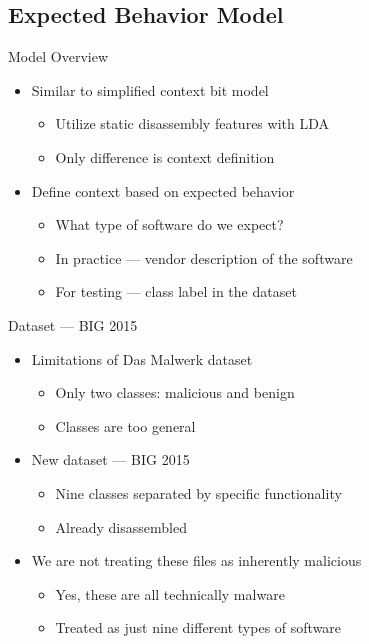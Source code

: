 \documentclass[handout,11pt]{beamer}
\begin{document}
	\subsection{Expected Behavior Model}
	\begin{frame}{Model Overview}
		\begin{itemize}
			\item Similar to simplified context bit model
				\begin{itemize}
					\item Utilize static disassembly features with LDA
					\item Only difference is context definition
				\end{itemize}
			\item Define context based on expected behavior
				\begin{itemize}
					\item What type of software do we expect?
					\item In practice --- vendor description of the software
					\item For testing --- class label in the dataset
				\end{itemize}
		\end{itemize}
	\end{frame}
	\begin{frame}{Dataset --- BIG 2015}
		\begin{itemize}
			\item Limitations of Das Malwerk dataset
				\begin{itemize}
					\item Only two classes: malicious and benign
					\item Classes are too general
				\end{itemize}
			\item New dataset --- BIG 2015~\cite{ronenMicrosoftMalware2018}
				\begin{itemize}
					\item Nine classes separated by specific functionality
					\item Already disassembled
				\end{itemize}
			\item We are not treating these files as inherently malicious
				\begin{itemize}
					\item Yes, these are all technically malware
					\item Treated as just nine different types of software
				\end{itemize}
		\end{itemize}
	\end{frame}
\end{document}
